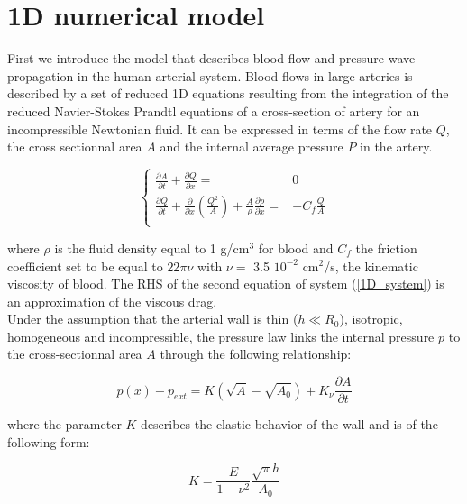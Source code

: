 \documentclass{config}
\begin{document}
\section{1D numerical model}\label{numerical_sec}

First we introduce the model that describes blood flow and pressure wave propagation in the human arterial system. Blood flows in large arteries is described by a set of reduced 1D equations resulting from the integration of the reduced Navier-Stokes Prandtl equations of a cross-section of artery for an incompressible Newtonian fluid. It can be expressed in terms of the flow rate $Q$, the cross sectionnal area $A$ and the internal average pressure $P$ in the artery. 

\begin{equation}\label{1D_system}
\left\{\begin{array}{rl}
\displaystyle \frac{\partial A}{ \partial t } + \frac{\partial Q}{\partial x} = & 0 \\ 
\displaystyle \frac{\partial Q}{\partial t} + \frac{\partial }{\partial x} \left( \frac{Q^2}{A}\right) + \frac{A}{\rho} \frac{\partial p }{\partial x} =&  \displaystyle - C_f \frac{Q}{A} \\
\end{array} \right.
\end{equation}

where $\rho$ is the fluid density equal to 1 g/cm$^3$ for blood and $C_f$ the friction coefficient set to be equal to $22 \pi \nu$ \cite{Cf} with $\nu = $ 3.5 $10^{-2}$ cm$^2$/s, the kinematic viscosity of blood. The RHS of the second equation of system (\ref{1D_system}) is an approximation of the viscous drag. \\ 

Under the assumption that the arterial wall is thin ($h \ll R_0$), isotropic, homogeneous and incompressible, the pressure law links the internal pressure $p$ to the cross-sectionnal area $A$ through the following relationship: 

\begin{equation}\label{pressure_law}
p(x) - p_{ext} = K (\sqrt{A} - \sqrt{A_0}) +  K_{\nu} \frac{\partial A}{\partial t}
\end{equation}

where the parameter $K$ describes the elastic behavior of the wall and is of the following form:

\begin{equation}\label{elastic_part}
K = \frac{E }{1 - \nu^2}\frac{\sqrt{\pi} h}{A_0} 
\end{equation}
\end{document}
